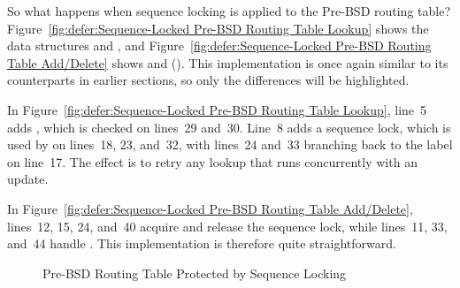 So what happens when sequence locking is applied to the Pre-BSD
routing table?
Figure~\ref{fig:defer:Sequence-Locked Pre-BSD Routing Table Lookup}
shows the data structures and , and
Figure~\ref{fig:defer:Sequence-Locked Pre-BSD Routing Table Add/Delete}
shows  and  ().
This implementation is once again similar to its counterparts in earlier
sections, so only the differences will be highlighted.

In
Figure~\ref{fig:defer:Sequence-Locked Pre-BSD Routing Table Lookup},
line~5 adds , which is checked on lines~29 and~30.
Line~8 adds a sequence lock, which is used by 
on lines~18, 23, and~32, with lines~24 and~33 branching back to
the  label on line~17.
The effect is to retry any lookup that runs concurrently with an update.

In
Figure~\ref{fig:defer:Sequence-Locked Pre-BSD Routing Table Add/Delete},
lines~12, 15, 24, and~40 acquire and release the sequence lock,
while lines~11, 33, and~44 handle .
This implementation is therefore quite straightforward.

\begin{figure}[tb]
\centering
{}
\caption{Pre-BSD Routing Table Protected by Sequence Locking}
\label{fig:defer:Pre-BSD Routing Table Protected by Sequence Locking}
\end{figure}

